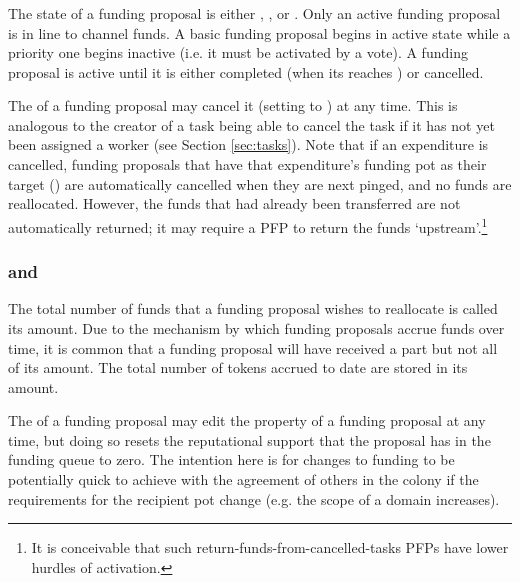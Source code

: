 \subsubsection*{}
The state of a funding proposal is either , ,  or . Only an active funding proposal is in line to channel funds. A basic funding proposal begins in active state while a priority one begins inactive (i.e. it must be activated by a vote). A funding proposal is active until it is either completed (when its  reaches ) or cancelled.

The  of a funding proposal may cancel it (setting  to ) at any time. This is analogous to the creator of a task being able to cancel the task if it has not yet been assigned a worker (see Section \ref{sec:tasks}). Note that if an expenditure is cancelled, funding proposals that have that expenditure's funding pot as their target () are automatically cancelled when they are next pinged, and no funds are reallocated. However, the funds that had already been transferred are not automatically returned; it may require a PFP to return the funds `upstream'.\footnote{It is conceivable that such return-funds-from-cancelled-tasks PFPs have lower hurdles of activation.}

\subsubsection*{ and }
The total number of funds that a funding proposal wishes to reallocate is called its  amount. Due to the mechanism by which funding proposals accrue funds over time, it is common that a funding proposal will have received a part but not all of its  amount. The total number of tokens accrued to date are stored in its  amount.

The  of a funding proposal may edit the  property of a funding proposal at any time, but doing so resets the reputational support that the proposal has in the funding queue to zero. The intention here is for changes to funding to be potentially quick to achieve with the agreement of others in the colony if the requirements for the recipient pot change (e.g. the scope of a domain increases).

